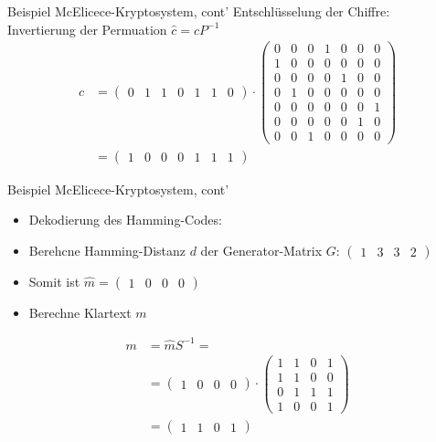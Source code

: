 \documentclass[11pt%
,aspectratio=169%
]{beamer}
\begin{document}
\begin{frame}{Beispiel McElicece-Kryptosystem, cont'}
Entschlüsselung der Chiffre:\\
Invertierung der Permuation $\hat{c} = cP^{-1}$
\begin{align*}
       c &= \begin{pmatrix} 0 & 1 & 1 & 0 & 1 & 1 & 0 \end{pmatrix} \cdot \begin{pmatrix} 0 & 0 & 0 & 1 & 0 & 0 & 0 \\ 1 & 0 & 0 & 0 & 0 & 0 & 0 \\ 0 & 0 & 0 & 0 & 1 & 0 & 0 \\ 0 & 1 & 0 & 0 & 0 & 0 & 0 \\ 0 & 0 & 0 & 0 & 0 & 0 & 1 \\ 0 & 0 & 0 & 0 & 0 & 1 & 0 \\ 0 & 0 & 1 & 0 & 0 & 0 & 0 \end{pmatrix}\\
       &= \begin{pmatrix} 1 & 0 & 0 & 0 & 1 & 1 & 1 \end{pmatrix}
\end{align*}
\end{frame}

\begin{frame}{Beispiel McElicece-Kryptosystem, cont'}
\begin{itemize}
    \item Dekodierung des Hamming-Codes:
    \item Berehcne Hamming-Distanz $d$ der Generator-Matrix $G$: $\begin{pmatrix} 1 & 3 & 3 & 2 \end{pmatrix}$
    \item Somit ist $\hat{m} = \begin{pmatrix} 1 & 0 & 0 & 0\end{pmatrix}$
    \item Berechne Klartext $m$
\end{itemize}

\begin{align*}
        m &= \hat{m}S^{-1}=\\
        &= \begin{pmatrix} 1 & 0 & 0 & 0 \end{pmatrix} \cdot \begin{pmatrix} 1 & 1 & 0 & 1 \\ 1 & 1 & 0 & 0 \\ 0 & 1 & 1 & 1 \\ 1 & 0 & 0 & 1 \end{pmatrix}\\
        &= \begin{pmatrix} 1 & 1 & 0 & 1 \end{pmatrix}
\end{align*}
\end{frame}
\end{document}
